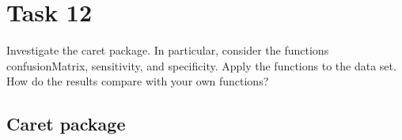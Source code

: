 \documentclass[]{article}
\newenvironment{Shaded}{\begin{snugshade}}{\end{snugshade}}
\newcommand{\KeywordTok}[1]{\textcolor[rgb]{0.13,0.29,0.53}{\textbf{#1}}}
\newcommand{\CharTok}[1]{\textcolor[rgb]{0.31,0.60,0.02}{#1}}
\newcommand{\StringTok}[1]{\textcolor[rgb]{0.31,0.60,0.02}{#1}}
\newcommand{\NormalTok}[1]{#1}
\begin{document}
\begin{Shaded}
\end{Shaded}

\section{Task 12}\label{task-12}

Investigate the caret package. In particular, consider the functions
confusionMatrix, sensitivity, and specificity. Apply the functions to
the data set. How do the results compare with your own functions?

\subsection{Caret package}\label{caret-package}
\end{document}
